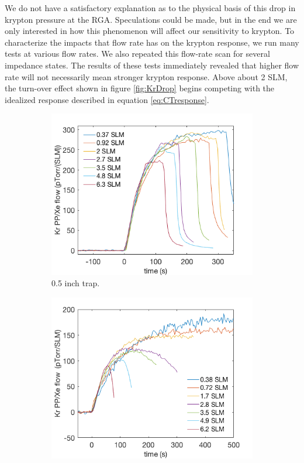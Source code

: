 \documentclass[12pt]{article}
\begin{document}
We do not have a satisfactory explanation as to the physical basis of this drop in krypton pressure at the RGA. Speculations could be made, but in the end we are only interested in how this phenomenon will affect our sensitivity to krypton. To characterize the impacts that flow rate has on the krypton response, we run many tests at various flow rates. We also repeated this flow-rate scan for several impedance states. The results of these tests immediately revealed that higher flow rate will not necessarily mean  stronger krypton response. Above about 2 SLM, the turn-over effect shown in figure \ref{fig:KrDrop} begins competing with the idealized response described in equation \ref{eq:CTresponse}.

\begin{figure}[h!]
\centering
\begin{subfigure}{0.5\textwidth}
  \centering
  \includegraphics[width=\textwidth]{Figures/SLAC_FlowResponse_15x.png}
  \caption{0.5 inch trap.}
  \label{fig:flow_traces_0p5}
\end{subfigure}%
\begin{subfigure}{0.5\textwidth}
  \centering
  \includegraphics[width=\textwidth]{Figures/SLAC_FlowResponse_15x_1p5in.png}

\end{subfigure}
\end{figure}
\end{document}
